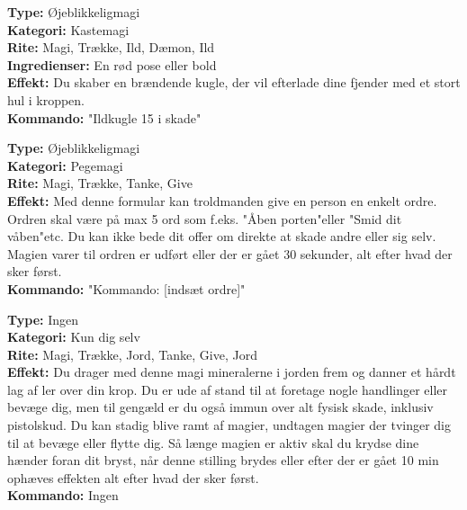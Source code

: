 \begin{lærmagi*}[Ildkugle]
\textbf{Type:} Øjeblikkeligmagi\\
\textbf{Kategori:} Kastemagi\\
\textbf{Rite:} Magi, Trække, Ild, Dæmon, Ild\\
\textbf{Ingredienser:} En rød pose eller bold\\
\textbf{Effekt:} Du skaber en brændende kugle, der vil efterlade dine fjender med et stort hul i kroppen.\\
\textbf{Kommando:} "Ildkugle 15 i skade"\\
\end{lærmagi*}

\begin{lærmagi*}[Kommando]
\textbf{Type:} Øjeblikkeligmagi\\
\textbf{Kategori:} Pegemagi\\
\textbf{Rite:} Magi, Trække, Tanke, Give\\
\textbf{Effekt:} Med denne formular kan troldmanden give en person en enkelt ordre. Ordren skal være på max 5 ord som f.eks. "Åben porten"eller "Smid dit våben"etc. Du kan ikke bede dit offer om direkte at skade andre eller sig selv. Magien varer til ordren er udført eller der er gået 30 sekunder, alt efter hvad der sker først.\\
\textbf{Kommando:} "Kommando: [indsæt ordre]"\\
\end{lærmagi*}

\begin{lærmagi*}[Lerform]
\textbf{Type:} Ingen\\
\textbf{Kategori:} Kun dig selv\\
\textbf{Rite:} Magi, Trække, Jord, Tanke, Give, Jord\\
\textbf{Effekt:} Du drager med denne magi mineralerne i jorden frem og danner et hårdt lag af ler over din krop. Du er ude af stand til at foretage nogle handlinger eller bevæge dig, men til gengæld er du også immun over alt fysisk skade, inklusiv pistolskud. Du kan stadig blive ramt af magier, undtagen magier der tvinger dig til at bevæge eller flytte dig. Så længe magien er aktiv skal du krydse dine hænder foran dit bryst, når denne stilling brydes eller efter der er gået 10 min ophæves effekten alt efter hvad der sker først.\\
\textbf{Kommando:} Ingen\\
\end{lærmagi*}


